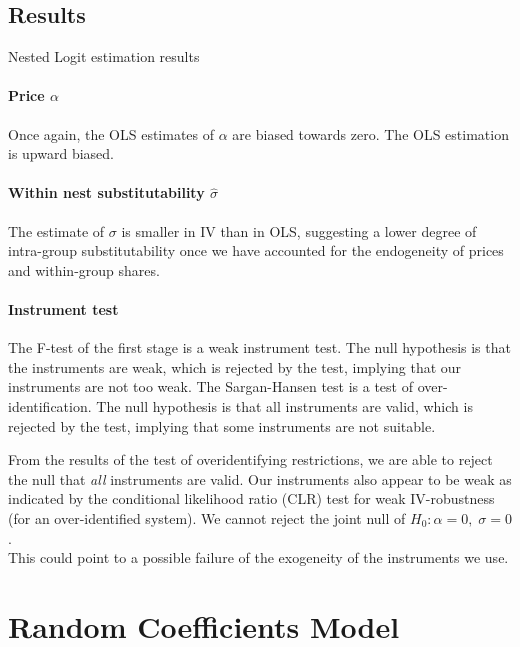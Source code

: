 \documentclass[12pt]{article}[margin=1in]
\begin{document}
\subsection{Results}

\begin{table}[h!]
    \fontsize{8pt}{10pt}\selectfont
    \centering
    
    \caption{Nested Logit estimation results}
    \label{tab:reg_nested_logit}
\end{table}

\paragraph{Price $\alpha$} Once again, the OLS estimates of $\alpha$ are biased towards zero. The OLS
estimation is upward biased.

\paragraph{Within nest substitutability $\hat{\sigma}$} The estimate of $\sigma$ is smaller in IV than in OLS, suggesting a lower degree of intra-group substitutability once we have accounted for the endogeneity of prices and within-group shares.

\paragraph{Instrument test}
The F-test of the first stage is a weak instrument test. The null hypothesis is
that the instruments are weak, which is rejected by the test, implying that our
instruments are not too weak. The Sargan-Hansen test is a test of
over-identification. The null hypothesis is that all instruments are valid,
which is rejected by the test, implying that some instruments are not suitable.

From the results of the test of overidentifying restrictions, we are able to
reject the null that \textit{all} instruments are valid. Our instruments also
appear to be weak as indicated by the conditional likelihood ratio (CLR) test
for weak IV-robustness (for an over-identified system). We cannot reject the
joint null of $H_0: \alpha=0, \; \sigma=0$. \\ This could point to a possible
failure of the exogeneity of the instruments we use.

\section{Random Coefficients Model}
\end{document}
